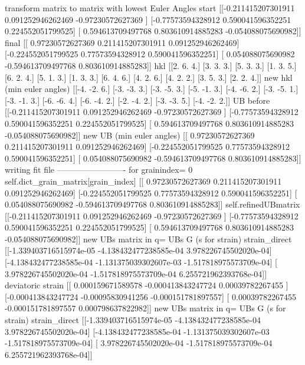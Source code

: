 \documentclass[letterpaper,10pt,english]{sphinxmanual}
\begin{document}
\begin{sphinxalltt}
transform matrix to matrix with lowest Euler Angles
start
 {[}{[}-0.211415207301911  0.091252946262469 -0.97230572627369 {]}
 {[}-0.77573594328912   0.590041596352251  0.224552051799525{]}
 {[} 0.594613709497768  0.803610914885283 -0.054088075690982{]}{]}
final
 {[}{[} 0.97230572627369   0.211415207301911  0.091252946262469{]}
 {[}-0.224552051799525  0.77573594328912   0.590041596352251{]}
 {[} 0.054088075690982 -0.594613709497768  0.803610914885283{]}{]}
hkl {[}{[}2. 6. 4.{]}
 {[}3. 3. 3.{]}
 {[}5. 3. 3.{]}
 {[}1. 3. 5.{]}
 {[}6. 2. 4.{]}
 {[}5. 1. 3.{]}
 {[}1. 3. 3.{]}
 {[}6. 4. 6.{]}
 {[}4. 2. 6.{]}
 {[}4. 2. 2.{]}
 {[}3. 5. 3.{]}
 {[}2. 2. 4.{]}{]}
new hkl (min euler angles) {[}{[}-4. -2.  6.{]}
 {[}-3. -3.  3.{]}
 {[}-3. -5.  3.{]}
 {[}-5. -1.  3.{]}
 {[}-4. -6.  2.{]}
 {[}-3. -5.  1.{]}
 {[}-3. -1.  3.{]}
 {[}-6. -6.  4.{]}
 {[}-6. -4.  2.{]}
 {[}-2. -4.  2.{]}
 {[}-3. -3.  5.{]}
 {[}-4. -2.  2.{]}{]}
UB before {[}{[}-0.211415207301911  0.091252946262469 -0.97230572627369 {]}
 {[}-0.77573594328912   0.590041596352251  0.224552051799525{]}
 {[} 0.594613709497768  0.803610914885283 -0.054088075690982{]}{]}
new UB (min euler angles) {[}{[} 0.97230572627369   0.211415207301911  0.091252946262469{]}
 {[}-0.224552051799525  0.77573594328912   0.590041596352251{]}
 {[} 0.054088075690982 -0.594613709497768  0.803610914885283{]}{]}
writing fit file -------------------------
for grainindex= 0
self.dict\_grain\_matrix{[}grain\_index{]} {[}{[} 0.97230572627369   0.211415207301911  0.091252946262469{]}
 {[}-0.224552051799525  0.77573594328912   0.590041596352251{]}
 {[} 0.054088075690982 -0.594613709497768  0.803610914885283{]}{]}
self.refinedUBmatrix {[}{[}-0.211415207301911  0.091252946262469 -0.97230572627369 {]}
 {[}-0.77573594328912   0.590041596352251  0.224552051799525{]}
 {[} 0.594613709497768  0.803610914885283 -0.054088075690982{]}{]}
new UBs matrix in q= UBs G (s for strain)
strain\_direct {[}{[}-1.339403716515974e-05 -4.138432477238585e-04  3.978226745502020e-04{]}
 {[}-4.138432477238585e-04 -1.131375039302607e-03 -1.517818975573709e-04{]}
 {[} 3.978226745502020e-04 -1.517818975573709e-04  6.255721962393768e-04{]}{]}
deviatoric strain {[}{[} 0.000159671589578 -0.000413843247724  0.00039782267455 {]}
 {[}-0.000413843247724 -0.00095830941256  -0.000151781897557{]}
 {[} 0.00039782267455  -0.000151781897557  0.000798637822982{]}{]}
new UBs matrix in q= UBs G (s for strain)
strain\_direct {[}{[}-1.339403716515974e-05 -4.138432477238585e-04  3.978226745502020e-04{]}
 {[}-4.138432477238585e-04 -1.131375039302607e-03 -1.517818975573709e-04{]}
 {[} 3.978226745502020e-04 -1.517818975573709e-04  6.255721962393768e-04{]}{]}

\end{sphinxalltt}
\end{document}
